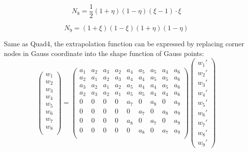 \begin{equation}
N_8 = \frac{1}{2} \left(1 + \eta \right) \left( 1 - \eta \right)  \left( \xi - 1\right) \cdot\xi
\end{equation}

\begin{equation}
N_9 = \left(1 + \xi \right) \left( 1 - \xi \right)  \left( 1 + \eta \right) \left(1 - \eta \right)
\end{equation}

Same as Quad4, the extrapolation function can be expressed by replacing corner nodes in Gauss coordinate into the shape function of Gauss points:
\begin{equation}
\begin{pmatrix}
w_1 \\
w_2 \\
w_3 \\
w_4 \\
w_5 \\
w_6 \\
w_7 \\
w_8 \\
\end{pmatrix} = \begin{pmatrix}
a_1 & a_2 &  a_3 &  a_2 & a_4 & a_5 & a_5 & a_4 & a_6       \\[0.3em]
a_2 & a_1 &  a_2 &  a_3 & a_4 & a_4 & a_5 & a_5 & a_6       \\[0.3em]
a_3 & a_2 &  a_1 &  a_2 & a_5 & a_4 & a_4 & a_5 & a_6       \\[0.3em]
a_2 & a_3 &  a_2 &  a_1 & a_5 & a_5 & a_4 & a_4 & a_6       \\[0.3em]
0     & 0    &  0     &  0     & a_7 & 0     & a_8 & 0    & a_9       \\[0.3em]
0     & 0    &  0     &  0     & 0    & a_7 & 0      & a_8 & a_9       \\[0.3em]
0     & 0    &  0     &  0     & a_8 & 0    & a_7 & 0      & a_9       \\[0.3em]
0     & 0    &  0     &  0     & 0     & a_8 & 0 & a_7     & a_9       \\[0.3em]                    
\end{pmatrix} \begin{pmatrix}
{w_1}' \\
{w_2}' \\
{w_3}' \\
{w_4}' \\
{w_5}' \\
{w_6}' \\
{w_7}' \\
{w_8}' \\
{w_9}'
\end{pmatrix}
\end{equation}	
